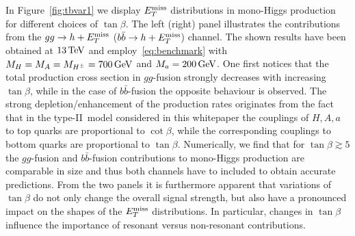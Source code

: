 In Figure~\ref{fig:tbvar1} we display $E_T^\mathrm{miss}$ distributions in mono-Higgs production for different choices of $\tan \beta$. The left (right) panel illustrates the contributions from the $gg \to h + E_T^\mathrm{miss}$ ($b \bar b \to h + E_T^\mathrm{miss}$) channel. The shown results have been obtained at $13 \, {\rm TeV}$ and employ~\eqref{eq:benchmark} with $M_{H} = M_{A} = M_{H^{\pm}} = 700 \, {\rm GeV}$ and $M_{a} = 200 \, {\rm GeV}$. One first notices that the total production cross section in $gg$-fusion strongly decreases with increasing $\tan \beta$, while in the case of $b \bar b$-fusion the opposite behaviour is observed. The strong depletion/enhancement of the production rates originates from the fact that in  the type-II~\hdma model considered in this whitepaper the couplings of $H,A,a$ to top quarks are proportional to $\cot \beta$, while the corresponding couplings to bottom quarks are proportional to $\tan \beta$. Numerically, we find that for $\tan \beta \gtrsim 5$ the $gg$-fusion and $b\bar b$-fusion contributions to mono-Higgs production are comparable in size and thus both channels have to included to obtain accurate predictions. From the two panels it is furthermore apparent that variations of $\tan \beta$ do not only change the overall signal strength, but also have a pronounced impact on the shapes of the $E_T^\mathrm{miss}$ distributions. In particular, changes in $\tan \beta$ influence the importance of resonant versus non-resonant contributions. 

